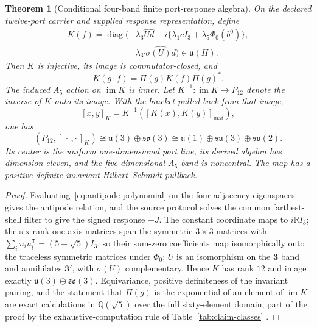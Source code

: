 \documentclass[11pt]{article}
\newtheorem{theorem}{Theorem}[section]
\theoremstyle{definition}
\theoremstyle{remark}
\begin{document}
\begin{theorem}[Conditional four-band finite port-response algebra]
\label{thm:finite-response}
On the declared twelve-port carrier and supplied response representation,
define
\begin{equation}
\begin{split}
K(f)=\operatorname{diag}\bigl(&
\lambda_3\widehat{Ud}
+i\{\lambda_1cI_3+\lambda_5\Phi_0(b^0)\},\\
&\lambda_{3'}\widehat{\sigma(U)d}\bigr)
\in\mathfrak u(H).
\end{split}
\label{eq:port-response-map}
\end{equation}
Then $K$ is injective, its image is commutator-closed, and
\[
K(g\!\cdot\! f)=\Pi(g)K(f)\Pi(g)^*.
\]
The induced $A_5$ action on $\operatorname{im}K$ is inner. Let
$K^{-1}:\operatorname{im}K\to P_{12}$ denote the inverse of $K$ onto its
image. With the bracket pulled back from that image,
\[
[x,y]_K=K^{-1}\!\left([K(x),K(y)]_{\mathrm{mat}}\right),
\]
one has
\begin{equation}
(P_{12},[\,\cdot\,,\cdot\,]_K)
\cong
\mathfrak u(3)\oplus\mathfrak{so}(3)
\cong
\mathfrak u(1)\oplus\mathfrak{su}(3)\oplus\mathfrak{su}(2).
\label{eq:liealgebra}
\end{equation}
Its center is the uniform one-dimensional port line, its derived algebra has
dimension eleven, and the five-dimensional $A_5$ band is noncentral. The map
has a positive-definite invariant Hilbert--Schmidt pullback.
\end{theorem}

\begin{proof}
Evaluating~\eqref{eq:antipode-polynomial} on the four adjacency eigenspaces
gives the antipode relation, and the source protocol solves the common
farthest-shell filter to give the signed response $-J$. The constant
coordinate maps to $i\mathbb RI_3$; the six rank-one axis matrices span the
symmetric $3\times3$ matrices with $\sum_iu_iu_i^{\mathsf T}=(5+\sqrt5)I_3$,
so their sum-zero coefficients map isomorphically onto the traceless
symmetric matrices under $\Phi_0$; $U$ is an isomorphism on the $\mathbf3$
band and annihilates $\mathbf3'$, with $\sigma(U)$ complementary. Hence $K$
has rank $12$ and image exactly $\mathfrak u(3)\oplus\mathfrak{so}(3)$.
Equivariance, positive definiteness of the invariant pairing, and the
statement that $\Pi(g)$ is the exponential of an element of
$\operatorname{im}K$ are exact calculations in $\mathbb Q(\sqrt5)$ over the
full sixty-element domain, part of the proof by the exhaustive-computation
rule of Table~\ref{tab:claim-classes} \cite{ophrepo}.
\end{proof}
\end{document}
